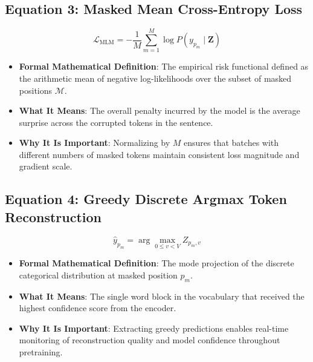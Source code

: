 \documentclass[11pt,a4paper]{article}
\theoremstyle{definition}
\begin{document}
\subsection{\textbf{Equation 3: Masked Mean Cross-Entropy Loss}}
{\boldmath
\begin{equation}
\mathcal{L}_{\text{MLM}} = -\frac{1}{M} \sum_{m=1}^M \log P(y_{p_m} \mid \mathbf{Z})
\end{equation}
}
\begin{itemize}
    \item \textbf{Formal Mathematical Definition}:
    The empirical risk functional defined as the arithmetic mean of negative log-likelihoods over the subset of masked positions $\mathcal{M}$.
    \item \textbf{What It Means}:
    The overall penalty incurred by the model is the average surprise across the corrupted tokens in the sentence.
    \item \textbf{Why It Is Important}:
    Normalizing by $M$ ensures that batches with different numbers of masked tokens maintain consistent loss magnitude and gradient scale.
\end{itemize}

\subsection{\textbf{Equation 4: Greedy Discrete Argmax Token Reconstruction}}
{\boldmath
\begin{equation}
\hat{y}_{p_m} = \arg\max_{0 \le v < V} Z_{p_m, v}
\end{equation}
}
\begin{itemize}
    \item \textbf{Formal Mathematical Definition}:
    The mode projection of the discrete categorical distribution at masked position $p_m$.
    \item \textbf{What It Means}:
    The single word block in the vocabulary that received the highest confidence score from the encoder.
    \item \textbf{Why It Is Important}:
    Extracting greedy predictions enables real-time monitoring of reconstruction quality and model confidence throughout pretraining.
\end{itemize}
\end{document}
